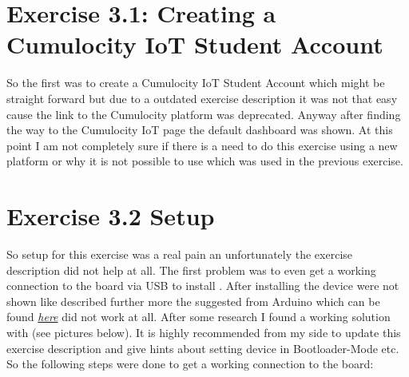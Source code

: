 \section{Exercise 3.1: Creating a Cumulocity IoT Student Account}
So the first was to create a Cumulocity IoT Student Account which might be straight forward but due to 
a outdated exercise description it was not that easy cause the link to the Cumulocity platform was deprecated.
Anyway after finding the way to the Cumulocity IoT page the default dashboard was shown. At this point I am 
not completely sure if there is a need to do this exercise using a new platform or why it is not possible to 
use  which was used in the previous exercise.


\section{Exercise 3.2 Setup}
So setup for this exercise was a real pain an unfortunately the exercise description did not help at all.
The first problem was to even get a working connection to the board via USB to install .
After installing  the device were not shown like described further more the 
suggested  from Arduino which can be found \href{https://labs.arduino.cc/en}{\textit{here}} 
did not work at all. After some research I found a working solution with  (see pictures below).
It is highly recommended from my side to update this exercise description and give hints about setting device 
in Bootloader-Mode etc.
\newline
\newline
So the following steps were done to get a working connection to the board:

